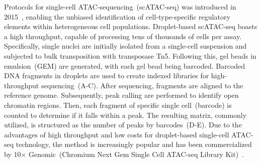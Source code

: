 Protocols for single-cell ATAC-sequencing~(scATAC-seq) was introduced in 2015~\citep{Buenrostro2015,cusanovich2015multiplex}, enabling the unbiased identification of cell-type-specific regulatory elements within heterogeneous cell populations. Droplet-based scATAC-seq boasts a high throughput, capable of processing tens of thousands of cells per assay. Specifically, single nuclei are initially isolated from a single-cell suspension and subjected to bulk transposition with transposase Tn5. Following this, gel beads in emulsion~(GEM) are generated, with each gel bead being barcoded. Barcoded DNA fragments in droplets are used to create indexed libraries for high-throughput sequencing~(A-C). After sequencing, fragments are aligned to the reference genome. Subsequently, peak calling are performed to identify open chromatin regions. Then, each fragment of specific single cell~(barcode) is counted to determine if it falls within a peak. The resulting matrix, commonly utilized, is structured as the number of peaks by barcodes~(D-E). Due to the advantages of high throughput and low costs for droplet-based single-cell ATAC-seq technology, the method is increasingly popular and has been commercialized by 10$\times$ Genomic~(Chromium Next Gem Single Cell ATAC-seq Library Kit)~\citep{satpathy2019massively}.


